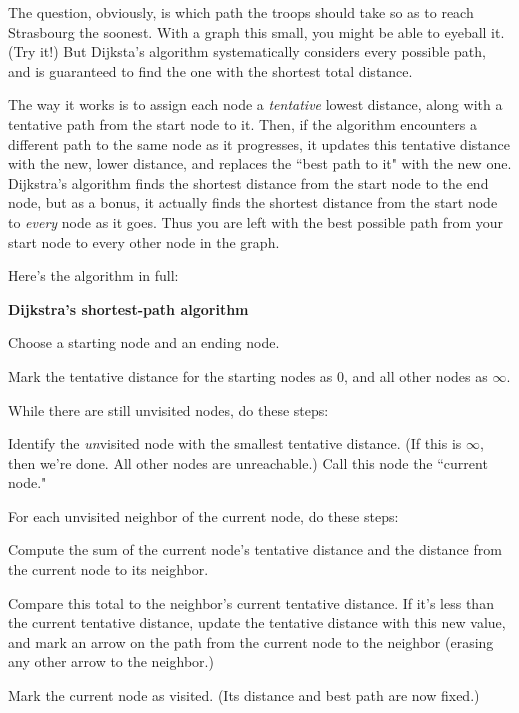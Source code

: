 The question, obviously, is which path the troops should take so as to
reach Strasbourg the soonest. With a graph this small, you might be able to
eyeball it. (Try it!) But Dijksta's algorithm systematically considers
every possible path, and is guaranteed to find the one with the shortest
total distance.

The way it works is to assign each node a \textit{tentative} lowest
distance, along with a tentative path from the start node to it. Then, if
the algorithm encounters a different path to the same node as it
progresses, it updates this tentative distance with the new, lower
distance, and replaces the ``best path to it" with the new one. Dijkstra's
algorithm finds the shortest distance from the start node to the end node,
but as a bonus, it actually finds the shortest distance from the start node
to \textit{every} node as it goes. Thus you are left with the best possible
path from your start node to every other node in the graph.

Here's the algorithm in full:

\vspace{.1in}
\begin{samepage}
\begin{framed}
\textbf{Dijkstra's shortest-path algorithm}
\begin{compactenum}
\item Choose a starting node and an ending node.
\item Mark the tentative distance for the starting nodes as 0, and all
other nodes as $\infty$.
\item While there are still unvisited nodes, do these steps:
    \begin{compactenum}
    \item \label{choose} Identify the \textit{un}visited node with the smallest tentative
distance. (If this is $\infty$, then we're done. All other nodes are
unreachable.) Call this node the ``current node."
    \item For each unvisited neighbor of the current node, do these steps:
        \begin{compactenum}
        \item Compute the sum of the current node's tentative distance and
the distance from the current node to its neighbor.
        \item Compare this total to the neighbor's current tentative
distance. If it's less than the current tentative distance, update the
tentative distance with this new value, and mark an arrow on the path from
the current node to the neighbor (erasing any other arrow to the neighbor.)
        \item Mark the current node as visited. (Its distance and best path
are now fixed.)
        \end{compactenum}
    \end{compactenum}
\end{compactenum}
\end{framed}
\end{samepage}
\vspace{.2in}

